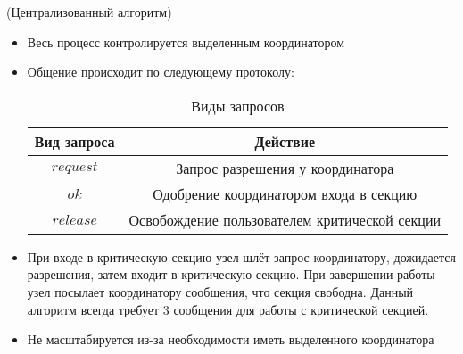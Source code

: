 \begin{algorithm}(Централизованный алгоритм)
    \begin{itemize}
        \item Весь процесс контролируется выделенным координатором
        \item Общение происходит по следующему протоколу:
            \begin{table}[!ht]
                \centering
                \begin{tabular}{|c|c|} \hline
                    Вид запроса & Действие \\ \hline
                    $request$ & Запрос разрешения у координатора \\ \hline
                    $ok$ & Одобрение координатором входа в секцию \\ \hline
                    $release$ & Освобождение пользователем критической секции \\ \hline
                \end{tabular}
                \caption{Виды запросов}
            \end{table}
        \item При входе в критическую секцию узел шлёт запрос координатору, дожидается разрешения, затем входит в критическую секцию. При завершении работы узел посылает координатору сообщения, что секция свободна. Данный алгоритм всегда требует 3 сообщения для работы с критической секцией.
        \item Не масштабируется из-за необходимости иметь выделенного координатора
    \end{itemize}
\end{algorithm}

